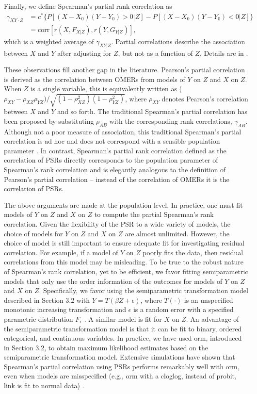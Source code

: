 \documentclass[12pt, usenatbib]{article}
\begin{document}
Finally, we define Spearman's partial rank correlation as 
 \begin{align*} 
    \gamma_{XY\cdot Z}
                  &=c^* \{P[(X-X_0)(Y-Y_0)>0|Z]-P[(X-X_0)(Y-Y_0)<0|Z]\} \\
                  &= \text{corr}[r(X, F_{X|Z}), r(Y,G_{Y|Z})],
  \end{align*}
which is a weighted average of $\gamma_{XY |Z}$.  Partial correlations describe the association between $X$ and $Y$ after adjusting for $Z$, but not as a function of $Z$.    Details are in \cite{liu2016}.

These observations fill another gap in the literature.  Pearson's partial correlation is derived as the correlation between OMERs from models of $Y$ on $Z$ and $X$ on $Z$.  When $Z$ is a single variable, this is equivalently written as ($\rho_{XY}-\rho_{XZ}\rho_{YZ})/\sqrt{(1-\rho^2_{XZ})(1-\rho_{YZ}^2)}$, where $\rho_{XY}$ denotes Pearson's correlation between $X$ and $Y$ and so forth.  The traditional Spearman's partial correlation has been proposed by substituting $\rho_{AB}$ with the corresponding rank correlations, $\gamma_{AB}$.  Although not a poor measure of association, this traditional Spearman's partial correlation is ad hoc and does not correspond with a sensible population parameter \citep{kendall1942, gripenberg1992}.  In contrast, Spearman's partial rank correlation defined as the correlation of PSRs directly corresponds to the population parameter of Spearman's rank correlation and is elegantly analogous to the definition of Pearson's partial correlation -- instead of the correlation of OMERs it is the correlation of PSRs.

The above arguments are made at the population level.  In practice, one must fit models of $Y$ on $Z$ and $X$ on $Z$ to compute the partial Spearman's rank correlation.  Given the flexibility of the PSR to a wide variety of models, the choice of models for $Y$ on $Z$ and $X$ on $Z$ are almost unlimited.  However, the choice of model is still important to ensure adequate fit for investigating residual correlation.  For example, if a model of $Y$ on $Z$ poorly fits the data, then residual correlations from this model may be misleading. To be true to the robust nature of Spearman's rank correlation, yet to be efficient, we favor fitting semiparametric models that only use the order information of the outcomes for models of $Y$ on $Z$ and $X$ on $Z$.  Specifically, we favor using the semiparametric transformation model described in Section 3.2 with $Y=T(\beta Z + \epsilon)$, where $T(\cdot)$ is an unspecified monotonic increasing transformation and $\epsilon$ is a random error with a specified parametric distribution $F_{\epsilon}$ \citep{zeng2007}.  A similar model is fit for $X$ on $Z$.  An advantage of the semiparametric transformation model is that it can be fit to binary, ordered categorical, and continuous variables.  In practice, we have used orm, introduced in Section 3.2, to obtain maximum likelihood estimates based on the semiparametric transformation model.  Extensive simulations have shown that Spearman's partial correlation using PSRs performs remarkably well with orm, even when models are misspecified (e.g., orm with a cloglog, instead of probit, link is fit to normal data) \citep{liu2016}.
\end{document}
